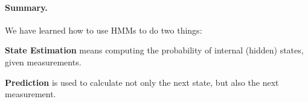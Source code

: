 \documentclass[10pt,a4paper]{article}
\newenvironment{itemize_packed}{
\begin{itemize}
\setlength{\itemsep}{0pt}
\setlength{\parskip}{0pt}
}{\end{itemize}}
\begin{document}
\paragraph{Summary.} We have learned how to use HMMs to do two things:
\begin{itemize_packed}
\item \textbf{State Estimation} means computing the probability of internal (hidden) states, given measurements.
\item \textbf{Prediction} is used to calculate not only the next state, but also the next measurement.
\end{itemize_packed}
\end{document}
